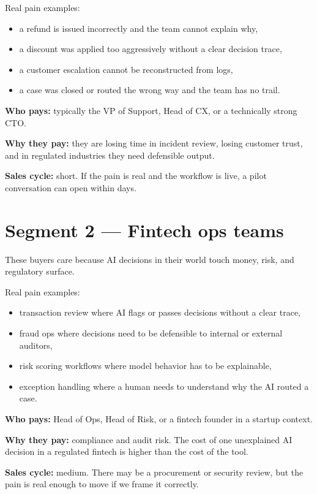 Real pain examples:

\begin{itemize}
  \item a refund is issued incorrectly and the team cannot explain why,
  \item a discount was applied too aggressively without a clear decision trace,
  \item a customer escalation cannot be reconstructed from logs,
  \item a case was closed or routed the wrong way and the team has no trail.
\end{itemize}

\textbf{Who pays:} typically the VP of Support, Head of CX, or a technically strong CTO.

\textbf{Why they pay:} they are losing time in incident review, losing customer trust, and in regulated industries they need defensible output.

\textbf{Sales cycle:} short. If the pain is real and the workflow is live, a pilot conversation can open within days.

\section{Segment 2 --- Fintech ops teams}

These buyers care because AI decisions in their world touch money, risk, and regulatory surface.

Real pain examples:

\begin{itemize}
  \item transaction review where AI flags or passes decisions without a clear trace,
  \item fraud ops where decisions need to be defensible to internal or external auditors,
  \item risk scoring workflows where model behavior has to be explainable,
  \item exception handling where a human needs to understand why the AI routed a case.
\end{itemize}

\textbf{Who pays:} Head of Ops, Head of Risk, or a fintech founder in a startup context.

\textbf{Why they pay:} compliance and audit risk. The cost of one unexplained AI decision in a regulated fintech is higher than the cost of the tool.

\textbf{Sales cycle:} medium. There may be a procurement or security review, but the pain is real enough to move if we frame it correctly.


